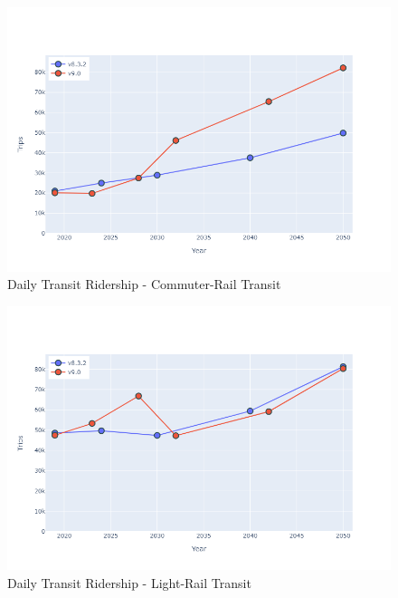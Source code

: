 \documentclass[
  letterpaper,
  DIV=11,
  numbers=noendperiod]{scrreprt}
\begin{document}
\begin{figure}[H]

{\centering \includegraphics{v9x/v900/whats-new/_pictures/pdf-hy-tr-crt.png}

}

\caption{\label{fig-pdf-hy-tr-crt}Daily Transit Ridership -
Commuter-Rail Transit}

\end{figure}

\begin{figure}[H]

{\centering \includegraphics{v9x/v900/whats-new/_pictures/pdf-hy-tr-lrt.png}

}

\caption{\label{fig-pdf-hy-tr-lrt}Daily Transit Ridership - Light-Rail
Transit}

\end{figure}
\end{document}
